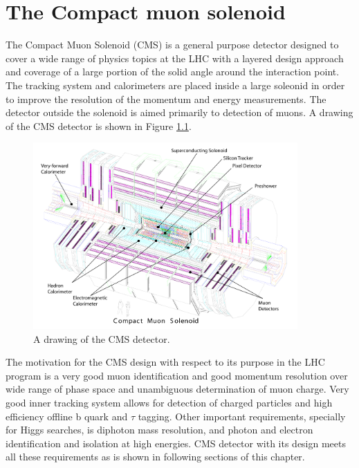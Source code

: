 \chapter{The Compact muon solenoid} %

\label{Chapter4} %


The Compact Muon Solenoid (CMS) is a general purpose detector designed to cover a wide range of physics topics at the LHC with a layered design approach and coverage of a large portion of the solid angle around the interaction point. The tracking system and calorimeters are placed inside a large soleonid in order to improve the resolution of the momentum and energy measurements. The detector outside the solenoid is aimed primarily to detection of muons. A drawing of the CMS detector is shown in Figure \ref{fig:CMS}. 
\begin{figure}[htbp]
	\centering
		\includegraphics[width=0.9\textwidth]{Figures/CMS.pdf}
	\caption[CMS detector]{A drawing of the CMS detector. \cite{Chatrchyan:2008aa}}
	\label{fig:CMS}
\end{figure}
\par The motivation for the CMS design with respect to its purpose in the LHC program is a very good muon identification and good momentum resolution over wide range of phase space and unambiguous determination of muon charge. Very good inner tracking system allows for detection of charged particles and high efficiency offline b quark and $\tau$ tagging. Other important requirements, specially for Higgs searches, is diphoton mass resolution, and photon and electron identification and isolation at high energies. 
CMS detector with its design meets all these requirements as is shown in following sections of this chapter. 

